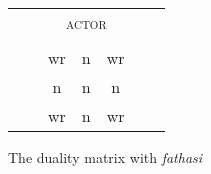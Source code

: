\begin{figure} 
	\begin{tabular}{|ccccccc|}
		\cline{3-5}
		\multicolumn{2}{c|}{}&\multicolumn{3}{c|}{\textsc{actor}}&\\\cline{3-5}
		\multicolumn{2}{c|}{}&\multicolumn{1}{c}{\Sg}&\multicolumn{1}{|c|}{\Du}&\multicolumn{1}{c|}{\Pl}&\\\cline{1-5}
		{\parbox[t]{2mm}{}}&\multicolumn{1}{|c|}{\parbox[t]{2mm}{}}&\multicolumn{1}{c}{\multirow{2}{*}{\hspace{0,1cm}wr\hspace{0,1cm}}}	&\multirow{2}{*}{\hspace{0,1cm}n\hspace{0,1cm}}	&\multicolumn{1}{c|}{\multirow{2}{*}{\hspace{0,1cm}wr\hspace{0,1cm}}}&\\
		&\multicolumn{1}{|c|}{}&&&\multicolumn{1}{c|}{}\\\cline{2-2}
		&\multicolumn{1}{|c|}{\parbox[t]{2mm}{}}&\multicolumn{1}{c}{\multirow{2}{*}{\hspace{0,1cm}n\hspace{0,1cm}}}&\multirow{2}{*}{\hspace{0,1cm}n\hspace{0,1cm}}&\multicolumn{1}{c|}{\multirow{2}{*}{\hspace{0,1cm}n\hspace{0,1cm}}}&\\
		&\multicolumn{1}{|c|}{}&&&\multicolumn{1}{c|}{}\\\cline{2-2}
		&\multicolumn{1}{|c|}{\parbox[t]{2mm}{}}&\multicolumn{1}{c}{\multirow{2}{*}{\hspace{0,1cm}wr\hspace{0,1cm}}}&\multirow{2}{*}{\hspace{0,1cm}n\hspace{0,1cm}}&\multicolumn{1}{c|}{\multirow{2}{*}{\hspace{0,1cm}wr\hspace{0,1cm}}}&\\
		&\multicolumn{1}{|c|}{}&&&\multicolumn{1}{c|}{}\\\cline{1-5}
	\end{tabular}
\caption{The duality matrix with \emph{fathasi}}
\label{dualitymatrixfathasi}
\end{figure}%

